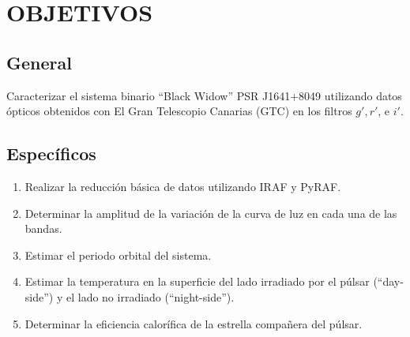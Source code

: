 \chapter*{OBJETIVOS}

\section*{General}
Caracterizar el sistema binario ``Black Widow''   PSR J1641+8049 utilizando datos ópticos obtenidos con El Gran Telescopio Canarias (GTC) en los filtros $g', r'$, e $i'$.


\section*{Específicos}

\begin{enumerate}
    \item Realizar la reducción básica de datos utilizando IRAF y PyRAF.
    \item Determinar la amplitud de la variación de la curva de luz en cada una de las bandas.
    \item Estimar el periodo orbital del sistema.
    \item Estimar la temperatura en la superficie del lado irradiado por el p\'ulsar (``day-side'') y el lado no irradiado (``night-side'').
    \item Determinar la eficiencia calorífica de la estrella compa\~nera del p\'ulsar.
\end{enumerate}

